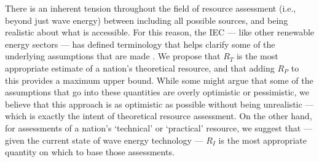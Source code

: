 There is an inherent tension throughout the field of resource assessment (i.e., beyond just wave energy) between including all possible sources, and being realistic about what is accessible. For this reason, the IEC — like other renewable energy sectors — has defined terminology that helps clarify some of the underlying assumptions that are made \citep[][]{internationalelectrotechnicalcommissionPartTerminologyEdition2020}. We propose that $R_T$ is the most appropriate estimate of a nation's theoretical resource, and that adding $R_P$ to this provides a maximum upper bound. While some might argue that some of the assumptions that go into these quantities are overly optimistic or pessimistic, we believe that this approach is as optimistic as possible without being unrealistic — which is exactly the intent of theoretical resource assessment.  On the other hand, for assessments of a nation's `technical' or `practical' resource, we suggest that — given the current state of wave energy technology — $R_I$ is the most appropriate quantity on which to base those assessments.

